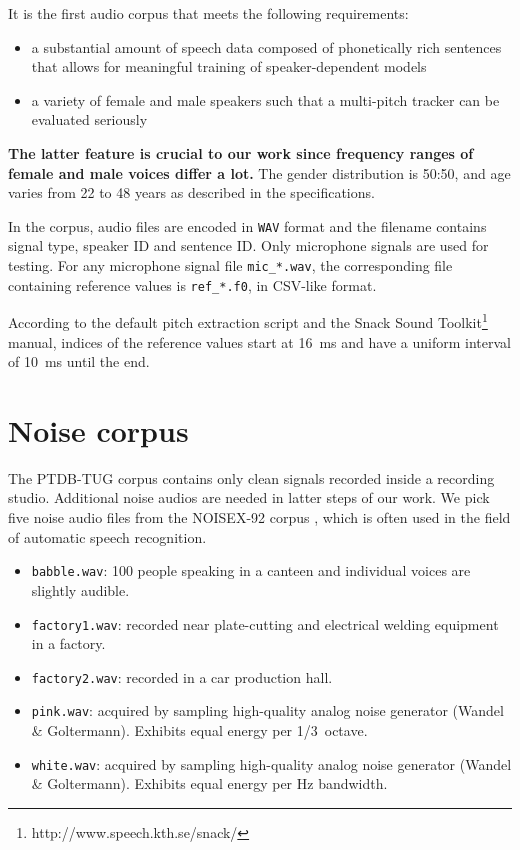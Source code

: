 \documentclass[11pt,a4paper]{report}
\begin{document}
It is the first audio corpus that meets the following requirements:

\begin{itemize}
  \item a substantial amount of speech data composed of phonetically rich sentences that allows for meaningful training of speaker-dependent models
  \item a variety of female and male speakers such that a multi-pitch tracker can be evaluated seriously
\end{itemize}

\textbf{The latter feature is crucial to our work since frequency ranges of female and male voices differ a lot.} The gender distribution is 50:50, and age varies from 22 to 48 years as described in the specifications.

\bigskip

In the corpus, audio files are encoded in \texttt{WAV} format and the filename contains signal type, speaker ID and sentence ID\@.
Only microphone signals are used for testing.
For any microphone signal file \texttt{mic\_*.wav}, the corresponding file containing reference values is \texttt{ref\_*.f0}, in CSV-like format.

According to the default pitch extraction script and the Snack Sound Toolkit\footnote{http://www.speech.kth.se/snack/} manual, indices of the reference values start at \SI{16}{\milli\second} and have a uniform interval of \SI{10}{\milli\second} until the end.

\section{Noise corpus}

The PTDB-TUG corpus contains only clean signals recorded inside a recording studio.
Additional noise audios are needed in latter steps of our work.
We pick five noise audio files from the NOISEX-92 corpus \parencite{varga1993assessment}, which is often used in the field of automatic speech recognition.

\begin{itemize}
  \item \texttt{babble.wav}: 100 people speaking in a canteen and individual voices are slightly audible.
  \item \texttt{factory1.wav}: recorded near plate-cutting and electrical welding equipment in a factory.
  \item \texttt{factory2.wav}: recorded in a car production hall.
  \item \texttt{pink.wav}: acquired by sampling high-quality analog noise generator (Wandel \& Goltermann).
    Exhibits equal energy per \SI{1/3}{octave}.
  \item \texttt{white.wav}: acquired by sampling high-quality analog noise generator (Wandel \& Goltermann).
    Exhibits equal energy per \si{\hertz} bandwidth.
\end{itemize}
\end{document}
